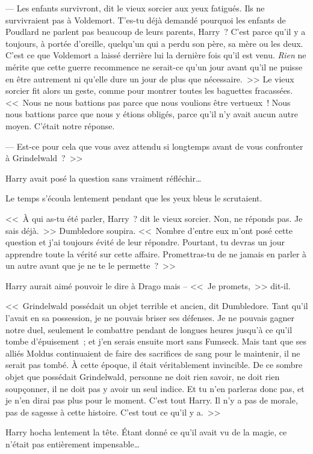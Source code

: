 --- Les enfants survivront, dit le vieux sorcier aux yeux fatigués. Ils ne survivraient pas à Voldemort. T'es-tu déjà demandé pourquoi les enfants de Poudlard ne parlent pas beaucoup de leurs parents, Harry~? C'est parce qu'il y a toujours, à portée d'oreille, quelqu'un qui a perdu son père, sa mère ou les deux. C'est ce que Voldemort a laissé derrière lui la dernière fois qu'il est venu. \emph{Rien} ne mérite que cette guerre recommence ne serait-ce qu'un jour avant qu'il ne puisse en être autrement ni qu'elle dure un jour de plus que nécessaire.~>> Le vieux sorcier fit alors un geste, comme pour montrer toutes les baguettes fracassées. <<~Nous ne nous battions pas parce que nous voulions être vertueux~! Nous nous battions parce que nous y étions obligés, parce qu'il n'y avait aucun autre moyen. C'était notre réponse.

--- Est-ce pour cela que vous avez attendu si longtemps avant de vous confronter à Grindelwald~?~>>

Harry avait posé la question sans vraiment réfléchir…

Le temps s'écoula lentement pendant que les yeux bleus le scrutaient.

<<~À qui as-tu été parler, Harry~? dit le vieux sorcier. Non, ne réponds pas. Je sais déjà.~>> Dumbledore soupira. <<~Nombre d'entre eux m'ont posé cette question et j'ai toujours évité de leur répondre. Pourtant, tu devras un jour apprendre toute la vérité sur cette affaire. Promettras-tu de ne jamais en parler à un autre avant que je ne te le permette~?~>>

Harry aurait aimé pouvoir le dire à Drago mais -- <<~Je promets,~>> dit-il.

<<~Grindelwald possédait un objet terrible et ancien, dit Dumbledore. Tant qu'il l'avait en sa possession, je ne pouvais briser ses défenses. Je ne pouvais gagner notre duel, seulement le combattre pendant de longues heures jusqu'à ce qu'il tombe d'épuisement~; et j'en serais ensuite mort sans Fumseck. Mais tant que ses alliés Moldus continuaient de faire des sacrifices de sang pour le maintenir, il ne serait pas tombé. À cette époque, il était véritablement invincible. De ce sombre objet que possédait Grindelwald, personne ne doit rien savoir, ne doit rien soupçonner, il ne doit pas y avoir un seul indice. Et tu n'en parleras donc pas, et je n'en dirai pas plus pour le moment. C'est tout Harry. Il n'y a pas de morale, pas de sagesse à cette histoire. C'est tout ce qu'il y a.~>>

Harry hocha lentement la tête. Étant donné ce qu'il avait vu de la magie, ce n'était pas entièrement impensable…

